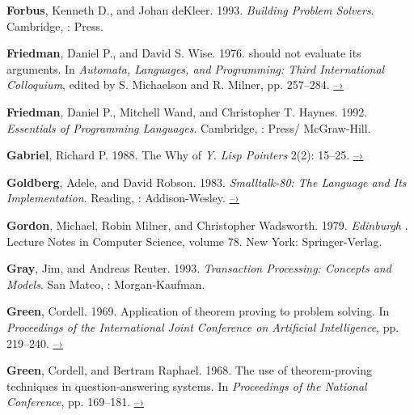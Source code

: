  \label{Forbus and deKleer 1993}
\textbf{Forbus}, Kenneth D., and Johan deKleer.  1993. \textit{Building Problem
Solvers}. Cambridge, :  Press.

 \label{Friedman and Wise (1976)}
\textbf{Friedman}, Daniel P., and David S. Wise.  1976.   should not
evaluate its arguments. In \textit{Automata, Languages, and Programming: Third
International Colloquium}, edited by S. Michaelson and R.  Milner, pp. 257--284.
\href{https://www.cs.indiana.edu/cgi-bin/techreports/TRNNN.cgi?trnum=TR44}{–›}

 \label{Friedman et al. 1992}
\textbf{Friedman}, Daniel P., Mitchell Wand, and Christopher T. Haynes. 1992.
\textit{Essentials of Programming Languages}.  Cambridge, : 
Press/ McGraw-Hill.

 \label{Gabriel 1988}
\textbf{Gabriel}, Richard P. 1988.  The Why of \emph{Y}.  \textit{Lisp Pointers}
2(2): 15--25.
\href{http://www.dreamsongs.com/Files/WhyOfY.pdf}{–›}

\textbf{Goldberg}, Adele, and David Robson.  1983.  \textit{Smalltalk-80: The Language and
Its Implementation}. Reading, : Addison-Wesley.
\href{http://stephane.ducasse.free.fr/FreeBooks/BlueBook/Bluebook.pdf}{–›}

 \label{Gordon et al. 1979}
\textbf{Gordon}, Michael, Robin Milner, and Christopher Wadsworth.  1979.
\textit{Edinburgh }. Lecture Notes in Computer Science, volume 78. New York:
Springer-Verlag.

 \label{Gray and Reuter 1993}
\textbf{Gray}, Jim, and Andreas Reuter. 1993. \textit{Transaction Processing: Concepts and
Models}. San Mateo, : Morgan-Kaufman.

 \label{Green 1969}
\textbf{Green}, Cordell.  1969.  Application of theorem proving to problem solving.  In
\textit{Proceedings of the International Joint Conference on Artificial
Intelligence}, pp. 219--240.
\href{http://citeseer.ist.psu.edu/viewdoc/summary?doi=10.1.1.81.9820}{–›}

 \label{Green and Raphael (1968)}
\textbf{Green}, Cordell, and Bertram Raphael.  1968.  The use of theorem-proving
techniques in question-answering systems.  In \textit{Proceedings of the
 National Conference}, pp. 169--181.
\href{http://www.kestrel.edu/home/people/green/publications/green-raphael.pdf}{–›}

